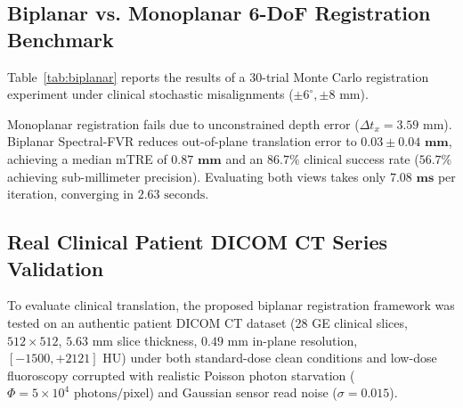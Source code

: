\documentclass[journal,twocolumn]{IEEEtran}
\begin{document}
\subsection{Biplanar vs. Monoplanar 6-DoF Registration Benchmark}
Table~\ref{tab:biplanar} reports the results of a 30-trial Monte Carlo registration experiment under clinical stochastic misalignments ($\pm 6^\circ, \pm 8\text{ mm}$).

\begin{table}[htbp]
\caption{30-Trial Monte Carlo 6-DoF Registration Benchmark}
\label{tab:biplanar}
\centering
{}
\end{table}

Monoplanar registration fails due to unconstrained depth error ($\Delta t_x = 3.59\text{ mm}$). Biplanar Spectral-FVR reduces out-of-plane translation error to $\mathbf{0.03 \pm 0.04\text{ mm}}$, achieving a median mTRE of $\mathbf{0.87\text{ mm}}$ and an $\mathbf{86.7\%}$ clinical success rate ($56.7\%$ achieving sub-millimeter precision). Evaluating both views takes only $\mathbf{7.08\text{ ms}}$ per iteration, converging in $2.63\text{ seconds}$.

\subsection{Real Clinical Patient DICOM CT Series Validation}
To evaluate clinical translation, the proposed biplanar registration framework was tested on an authentic patient DICOM CT dataset (28 GE clinical slices, $512 \times 512$, $5.63\text{ mm}$ slice thickness, $0.49\text{ mm}$ in-plane resolution, $[-1500, +2121]\text{ HU}$) under both standard-dose clean conditions and low-dose fluoroscopy corrupted with realistic Poisson photon starvation ($\Phi = 5 \times 10^4\text{ photons/pixel}$) and Gaussian sensor read noise ($\sigma = 0.015$).
\end{document}

